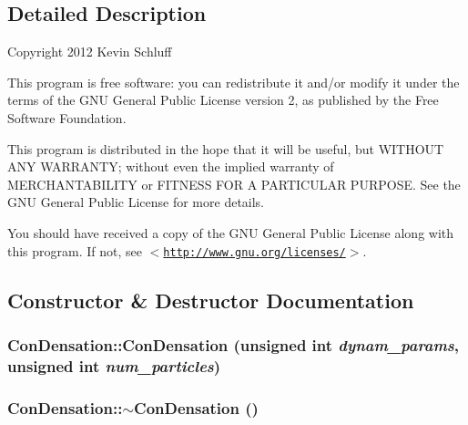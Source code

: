 \subsection{Detailed Description}
Copyright 2012 Kevin Schluff

This program is free software: you can redistribute it and/or modify it under the terms of the GNU General Public License version 2, as published by the Free Software Foundation.

This program is distributed in the hope that it will be useful, but WITHOUT ANY WARRANTY; without even the implied warranty of MERCHANTABILITY or FITNESS FOR A PARTICULAR PURPOSE. See the GNU General Public License for more details.

You should have received a copy of the GNU General Public License along with this program. If not, see $<$\href{http://www.gnu.org/licenses/}{\tt http://www.gnu.org/licenses/}$>$. 

\subsection{Constructor \& Destructor Documentation}
\hypertarget{classConDensation_a3c7e76ac520287c7eb12bf3b05ad5fa0}{
\subsubsection[{ConDensation}]{\setlength{\rightskip}{0pt plus 5cm}ConDensation::ConDensation (unsigned int {\em dynam\_\-params}, \/  unsigned int {\em num\_\-particles})}}
\label{classConDensation_a3c7e76ac520287c7eb12bf3b05ad5fa0}
\hypertarget{classConDensation_aa8176dc480168102bdd41ea10b977878}{
\subsubsection[{$\sim$ConDensation}]{\setlength{\rightskip}{0pt plus 5cm}ConDensation::$\sim$ConDensation ()}}
\label{classConDensation_aa8176dc480168102bdd41ea10b977878}


